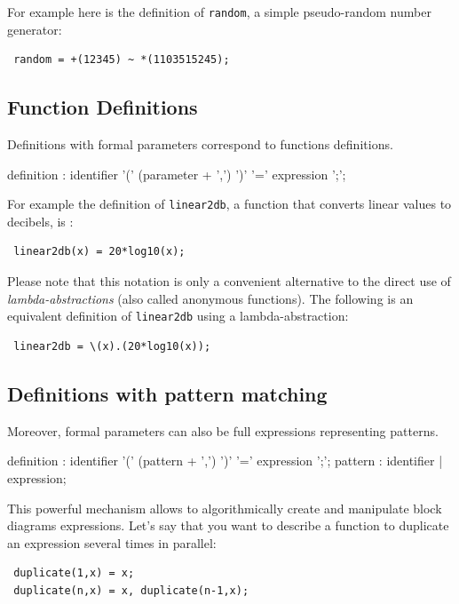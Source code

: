 \documentclass[a4paper,10pt]{book}
\begin{document}
For example here is the definition of \lstinline'random', a simple pseudo-random number generator:

\begin{lstlisting}
 random = +(12345) ~ *(1103515245);
\end{lstlisting}


\subsection{Function Definitions}

Definitions with formal parameters correspond to functions definitions.

\begin{rail}
definition  : identifier '(' (parameter + ',')  ')' '=' expression ';';
\end{rail} 

For example the definition of \lstinline'linear2db', a function that converts linear values to decibels, is :

\begin{lstlisting}
 linear2db(x) = 20*log10(x);
\end{lstlisting}
 
Please note that this notation is only a convenient alternative to the direct use of \textit{lambda-abstractions} (also called anonymous functions). The following is an equivalent definition of \lstinline'linear2db' using a lambda-abstraction:

\begin{lstlisting}
 linear2db = \(x).(20*log10(x));
\end{lstlisting}


\subsection{Definitions with pattern matching}

Moreover, formal parameters can also be full expressions representing patterns. 
\begin{rail}
definition  : identifier '(' (pattern + ',')  ')' '=' expression ';';
pattern : identifier | expression; 
\end{rail}

This powerful mechanism allows to algorithmically create and manipulate block diagrams expressions. Let's say that you want to describe a function to duplicate an expression several times in parallel:
\begin{lstlisting}
 duplicate(1,x) = x;
 duplicate(n,x) = x, duplicate(n-1,x);
\end{lstlisting}
\end{document}
